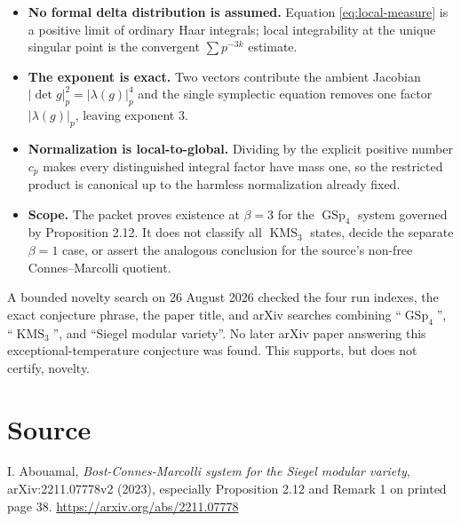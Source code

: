 \documentclass[11pt]{article}
\newcommand{\GSp}{\operatorname{GSp}_4}
\newcommand{\KMS}{\operatorname{KMS}}
\begin{document}
\begin{itemize}[leftmargin=1.5em,itemsep=3pt]
  \item \textbf{No formal delta distribution is assumed.}  Equation
  \eqref{eq:local-measure} is a positive limit of ordinary Haar integrals;
  local integrability at the unique singular point is the convergent
  $\sum p^{-3k}$ estimate.
  \item \textbf{The exponent is exact.}  Two vectors contribute the ambient
  Jacobian $|\det g|_p^2=|\lambda(g)|_p^4$ and the single symplectic equation
  removes one factor $|\lambda(g)|_p$, leaving exponent $3$.
  \item \textbf{Normalization is local-to-global.}  Dividing by the explicit
  positive number $c_p$ makes every distinguished integral factor have mass
  one, so the restricted product is canonical up to the harmless normalization
  already fixed.
  \item \textbf{Scope.}  The packet proves existence at $\beta=3$ for the
  $\GSp$ system governed by Proposition 2.12.  It does not classify all
  $\KMS_3$ states, decide the separate $\beta=1$ case, or assert the analogous
  conclusion for the source's non-free Connes--Marcolli quotient.
\end{itemize}

A bounded novelty search on 26 August 2026 checked the four run indexes, the
exact conjecture phrase, the paper title, and arXiv searches combining
``$\GSp$'', ``$\KMS_3$'', and ``Siegel modular variety''.  No later arXiv paper
answering this exceptional-temperature conjecture was found.  This supports,
but does not certify, novelty.

\section*{Source}

I. Abouamal, \emph{Bost-Connes-Marcolli system for the Siegel modular
variety}, arXiv:2211.07778v2 (2023), especially Proposition 2.12 and Remark 1
on printed page 38.  \url{https://arxiv.org/abs/2211.07778}
\end{document}
